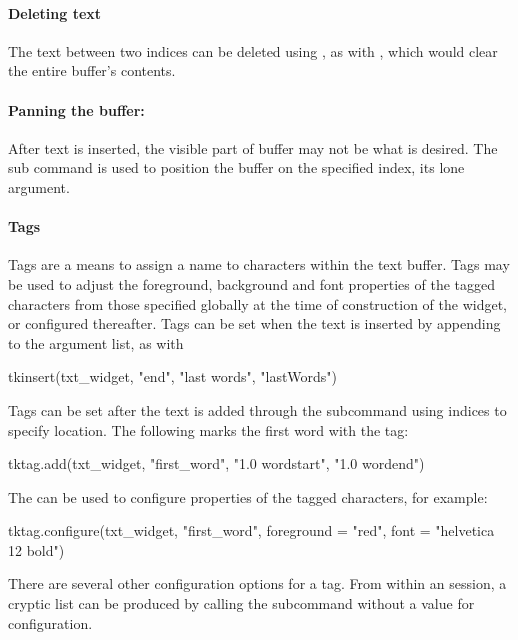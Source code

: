 \paragraph{Deleting text}

The text between two indices can be deleted using , as
with , which would clear the entire
buffer's contents.

\paragraph{Panning the buffer: }
After text is inserted, the visible part of buffer may not be what is
desired. The  sub command is used to position
the buffer on the specified index, its lone argument.


\paragraph{Tags}
Tags are a means to assign a name to characters within the text
buffer. Tags may be used to adjust the foreground, background and font
properties of the tagged characters from those specified globally at
the time of construction of the widget, or configured thereafter. Tags
can be set when the text is inserted by appending to the argument
list, as with
\begin{Schunk}
\begin{Sinput}
 tkinsert(txt_widget, "end", "last words", "lastWords") 
\end{Sinput}
\end{Schunk}

Tags can be set after the text is added through the
 subcommand using indices to specify
location. The following marks the first word with the 
tag:
\begin{Schunk}
\begin{Sinput}
 tktag.add(txt_widget, "first_word", "1.0 wordstart", "1.0 wordend")
\end{Sinput}
\end{Schunk}
The  can be used to configure properties of the tagged characters, for example:
\begin{Schunk}
\begin{Sinput}
 tktag.configure(txt_widget, "first_word", foreground = "red", 
                 font = "helvetica 12 bold")
\end{Sinput}
\end{Schunk}
%
There are several other configuration options for a tag. From within
an \R\/ session, a cryptic list can be produced by calling the
subcommand  without a value for
configuration.


